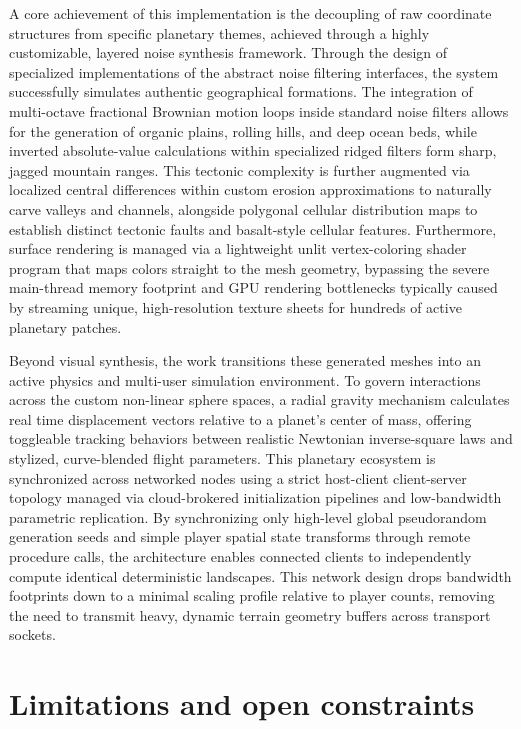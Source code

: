 \documentclass[12pt]{report}
\begin{document}
A core achievement of this implementation is the decoupling of raw coordinate structures from specific planetary themes, achieved through a highly customizable, layered noise synthesis framework. Through the design of specialized implementations of the abstract noise filtering interfaces, the system successfully simulates authentic geographical formations. The integration of multi-octave fractional Brownian motion loops inside standard noise filters allows for the generation of organic plains, rolling hills, and deep ocean beds, while inverted absolute-value calculations within specialized ridged filters form sharp, jagged mountain ranges. This tectonic complexity is further augmented via localized central differences within custom erosion approximations to naturally carve valleys and channels, alongside polygonal cellular distribution maps to establish distinct tectonic faults and basalt-style cellular features. Furthermore, surface rendering is managed via a lightweight unlit vertex-coloring shader program that maps colors straight to the mesh geometry, bypassing the severe main-thread memory footprint and GPU rendering bottlenecks typically caused by streaming unique, high-resolution texture sheets for hundreds of active planetary patches.

Beyond visual synthesis, the work transitions these generated meshes into an active physics and multi-user simulation environment. To govern interactions across the custom non-linear sphere spaces, a radial gravity mechanism calculates real time displacement vectors relative to a planet's center of mass, offering toggleable tracking behaviors between realistic Newtonian inverse-square laws and stylized, curve-blended flight parameters. This planetary ecosystem is synchronized across networked nodes using a strict host-client client-server topology managed via cloud-brokered initialization pipelines and low-bandwidth parametric replication. By synchronizing only high-level global pseudorandom generation seeds and simple player spatial state transforms through remote procedure calls, the architecture enables connected clients to independently compute identical deterministic landscapes. This network design drops bandwidth footprints down to a minimal scaling profile relative to player counts, removing the need to transmit heavy, dynamic terrain geometry buffers across transport sockets.

\section{Limitations and open constraints}
\end{document}
